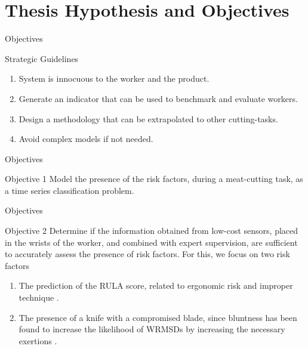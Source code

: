 \section{Thesis Hypothesis and Objectives}
\frame{\sectionpage}



\begin{frame}{Objectives}
    \begin{alertblock}{Strategic Guidelines}
        \begin{enumerate}
            \item System is innocuous to the worker and the product.
            \item Generate an indicator that can be used to benchmark and evaluate workers.
            \item Design a methodology that can be extrapolated to other cutting-tasks.
            \item Avoid complex models if not needed.
        \end{enumerate}
    \end{alertblock}
\end{frame}

\begin{frame}{Objectives}
    \begin{alertblock}{Objective 1}
    Model the presence of the risk factors, during a meat-cutting task, as a time series classification problem.
    \end{alertblock}
\end{frame}

\begin{frame}{Objectives}
    \begin{alertblock}{Objective 2}
    Determine if the information obtained from low-cost sensors, placed in the wrists of the worker, and combined with expert supervision, are sufficient to accurately assess the presence of risk factors. For this, we focus on two risk factors 
    \begin{enumerate}
        \item The prediction of the RULA score, related to ergonomic risk and improper technique \cite{ViikariJuntura1983}.
        \item The presence of a knife with a compromised blade, since bluntness has been found to increase the likelihood of WRMSDs by increasing the necessary exertions \cite{Marsot2007,Karltun2016,Savescu2018}.
    \end{enumerate}
    \end{alertblock}
\end{frame}

